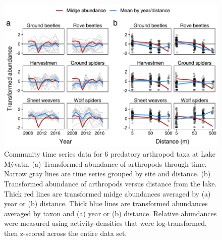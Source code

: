 \documentclass[12pt]{article}
\begin{document}
\clearpage

\begin{figure}
\centering
\includegraphics{fig1.pdf}
\caption{\label{fig:obs-data}
Community time series data for 6 predatory arthropod taxa at Lake M\'{y}vatn.
(a) Transformed abundance of arthropods through time.
Narrow gray lines are time series grouped by site and distance.
(b) Transformed abundance of arthropods versus distance from the lake.
Thick red lines are transformed midge abundances averaged by (a) year or (b) distance.
Thick blue lines are transformed abundances averaged by taxon and
(a) year or (b) distance.
Relative abundances were measured using activity-densities that were log-transformed,
then z-scored across the entire data set.
}
\end{figure}




\clearpage
\end{document}
